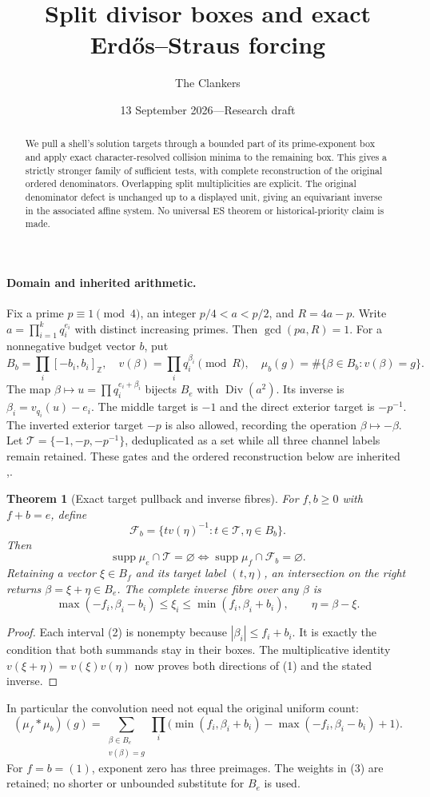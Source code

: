 \documentclass[10pt,a4paper]{article}
\title{Split divisor boxes and exact Erd\H{o}s--Straus forcing}
\author{The Clankers}
\date{13 September 2026\quad---\quad Research draft}
\newtheorem{theorem}{Theorem}
\begin{document}
\maketitle
\begin{abstract}
We pull a shell's solution targets through a bounded part of its prime-exponent
box and apply exact character-resolved collision minima to the remaining box.
This gives a strictly stronger family of sufficient tests, with complete
reconstruction of the original ordered denominators. Overlapping split
multiplicities are explicit. The original denominator defect is unchanged
up to a displayed unit, giving an equivariant inverse in the associated
affine system. No universal ES theorem or historical-priority claim is made.
\end{abstract}

\paragraph{Domain and inherited arithmetic.}
Fix a prime $p\equiv1\pmod4$, an integer $p/4<a<p/2$, and
$R=4a-p$. Write $a=\prod_{i=1}^kq_i^{e_i}$ with distinct increasing primes.
Then $\gcd(pa,R)=1$. For a nonnegative budget vector $b$, put
\[
 B_b=\prod_i[-b_i,b_i]_{\mathbb Z},\quad
 v(\beta)=\prod_iq_i^{\beta_i}\pmod R,\quad
 \mu_b(g)=\#\{\beta\in B_b:v(\beta)=g\}.
\]
The map $\beta\mapsto u=\prod q_i^{e_i+\beta_i}$ bijects $B_e$ with
$\operatorname{Div}(a^2)$. Its inverse is $\beta_i=v_{q_i}(u)-e_i$.
The middle target is $-1$ and the direct exterior target is $-p^{-1}$.
The inverted exterior target $-p$ is also allowed, recording the operation
$\beta\mapsto-\beta$. Let $\mathcal T=\{-1,-p,-p^{-1}\}$, deduplicated
as a set while all three channel labels remain retained.
These gates and the ordered reconstruction below are inherited
\cite[\S2, Propositions 2.2 and 2.6]{ET},\cite{Prior}.

\begin{theorem}[Exact target pullback and inverse fibres]
For $f,b\ge0$ with $f+b=e$, define
\[
 \mathcal F_b=\{t v(\eta)^{-1}:t\in\mathcal T,\eta\in B_b\}.
\]
Then
\[
 \operatorname{supp}\mu_e\cap\mathcal T=\varnothing
 \iff \operatorname{supp}\mu_f\cap\mathcal F_b=\varnothing.
 \tag{1}
\]
Retaining a vector $\xi\in B_f$ and its target label $(t,\eta)$, an
intersection on the right returns $\beta=\xi+\eta\in B_e$.
The complete inverse fibre over any $\beta$ is
\[
 \max(-f_i,\beta_i-b_i)\le\xi_i\le\min(f_i,\beta_i+b_i),
 \qquad\eta=\beta-\xi.\tag{2}
\]
\end{theorem}
\begin{proof}
Each interval (2) is nonempty because $|\beta_i|\le f_i+b_i$.
It is exactly the condition that both summands stay in their boxes.
The multiplicative identity $v(\xi+\eta)=v(\xi)v(\eta)$ now proves
both directions of (1) and the stated inverse.
\end{proof}
In particular the convolution need not equal the original uniform count:
\[
 (\mu_f*\mu_b)(g)=\sum_{\substack{\beta\in B_e\\v(\beta)=g}}
 \prod_i\bigl(\min(f_i,\beta_i+b_i)-\max(-f_i,\beta_i-b_i)+1\bigr).
 \tag{3}
\]
For $f=b=(1)$, exponent zero has three preimages. The weights in (3)
are retained; no shorter or unbounded substitute for $B_e$ is used.
\end{document}
